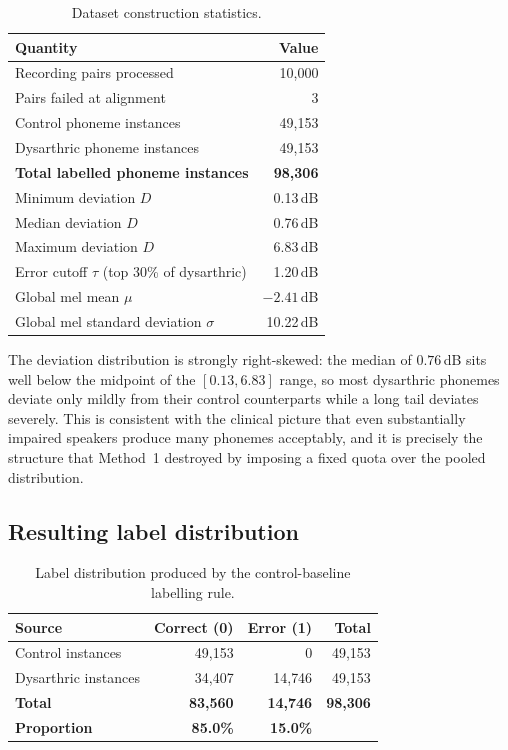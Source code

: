 \begin{table}[H]
\centering
\caption[Dataset construction statistics]{Dataset construction statistics.}
\label{tab:dataset-stats}
\begin{tabular}{@{}lr@{}}
\toprule
\textbf{Quantity} & \textbf{Value} \\
\midrule
Recording pairs processed              & 10{,}000 \\
Pairs failed at alignment              & 3 \\
Control phoneme instances              & 49{,}153 \\
Dysarthric phoneme instances           & 49{,}153 \\
\textbf{Total labelled phoneme instances} & \textbf{98{,}306} \\
\midrule
Minimum deviation $D$                  & 0.13\,dB \\
Median deviation $D$                   & 0.76\,dB \\
Maximum deviation $D$                  & 6.83\,dB \\
Error cutoff $\tau$ (top 30\% of dysarthric) & 1.20\,dB \\
\midrule
Global mel mean $\mu$                  & $-2.41$\,dB \\
Global mel standard deviation $\sigma$ & 10.22\,dB \\
\bottomrule
\end{tabular}
\end{table}

The deviation distribution is strongly right-skewed: the median of $0.76$\,dB
sits well below the midpoint of the $[0.13, 6.83]$ range, so most dysarthric
phonemes deviate only mildly from their control counterparts while a long tail
deviates severely. This is consistent with the clinical picture that even
substantially impaired speakers produce many phonemes acceptably, and it is
precisely the structure that Method~1 destroyed by imposing a fixed quota over
the pooled distribution.

\subsection{Resulting label distribution}

\begin{table}[H]
\centering
\caption[Label distribution under Method 2]{Label distribution produced by the
control-baseline labelling rule.}
\label{tab:label-dist}
\begin{tabular}{@{}lrrr@{}}
\toprule
\textbf{Source} & \textbf{Correct (0)} & \textbf{Error (1)} & \textbf{Total} \\
\midrule
Control instances    & 49{,}153 & 0        & 49{,}153 \\
Dysarthric instances & 34{,}407 & 14{,}746 & 49{,}153 \\
\midrule
\textbf{Total}       & \textbf{83{,}560} & \textbf{14{,}746} & \textbf{98{,}306} \\
\textbf{Proportion}  & \textbf{85.0\%}   & \textbf{15.0\%}   & \\
\bottomrule
\end{tabular}
\end{table}

